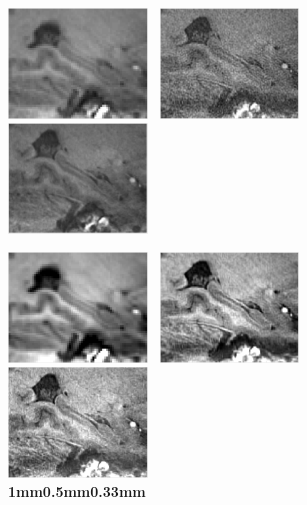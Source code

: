 \documentclass[]{article}
\begin{document}
\begin{figure}
	
	{\includegraphics[width=0.33\textwidth]{noisy5025_200_y.pdf}}~
	{\includegraphics[width=0.33\textwidth]{noisy5025_400_y.pdf}}~
	{\includegraphics[width=0.33\textwidth]{noisy5025_600_y.pdf}}~\\
	
	
	\vspace{-1em}
	
	
	{\includegraphics[width=0.33\textwidth]{denoised5025_200_y.pdf}}~
	{\includegraphics[width=0.33\textwidth]{denoised5025_400_y.pdf}}~
	{\includegraphics[width=0.33\textwidth]{denoised5025_600_y.pdf}}~\\
	\vspace{-1em}
	\hspace{5em}\textbf{1mm}\hspace{9em}\textbf{0.5mm}\hspace{8em}\textbf{0.33mm}
\end{figure}
\end{document}
